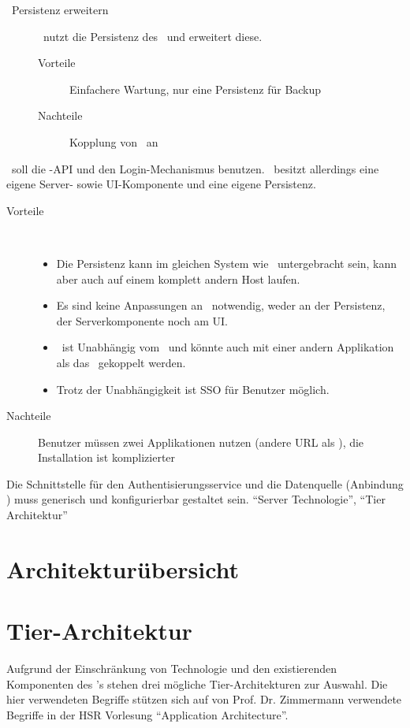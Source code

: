 {{\begin{description}
					\item[\cdar\ Persistenz erweitern]
					\eeppi\ nutzt die Persistenz des \cdar\ und erweitert diese.
					\begin{description}
						\item[Vorteile] Einfachere Wartung, nur eine Persistenz für Backup
						\item[Nachteile] Kopplung von \eeppi\ an \cdar
					\end{description}
				\end{description}
			}
			{
				\eeppi\ soll die \cdar-API und den Login-Mechanismus benutzen. \eeppi\ besitzt allerdings eine eigene Server- sowie UI-Komponente und eine eigene Persistenz. 
				\begin{description}
					\item[Vorteile] \
						\begin{itemize}
							\item Die Persistenz kann im gleichen System wie \cdar\ untergebracht sein, kann aber auch auf einem komplett andern Host laufen.
							\item Es sind keine Anpassungen an \cdar\ notwendig, weder an der Persistenz, der Serverkomponente noch am UI.
							\item \eeppi\ ist Unabhängig vom \cdar\ und könnte auch mit einer andern Applikation als das \cdar\ gekoppelt werden.
							\item Trotz der Unabhängigkeit ist SSO für Benutzer möglich.
						\end{itemize}
					\item[Nachteile] Benutzer müssen zwei Applikationen nutzen (andere URL als \cdar), die Installation ist komplizierter
				\end{description}}
			{}
			{Die Schnittstelle für den Authentisierungsservice und die Datenquelle (Anbindung \cdar) muss generisch und konfigurierbar gestaltet sein.}
			{"`Server Technologie"', "`Tier Architektur"'}
		}
		

	\section{Architekturübersicht}
	
	
	\section{Tier-Architektur}
		Aufgrund der Einschränkung von Technologie und den existierenden Komponenten des \cdar's stehen drei mögliche Tier-Architekturen zur Auswahl.
		Die hier verwendeten Begriffe stützen sich auf von Prof. Dr. Zimmermann verwendete Begriffe in der HSR Vorlesung "`Application Architecture"'\cite{prof._dr._zimmerman_layers_2014}.		
		
